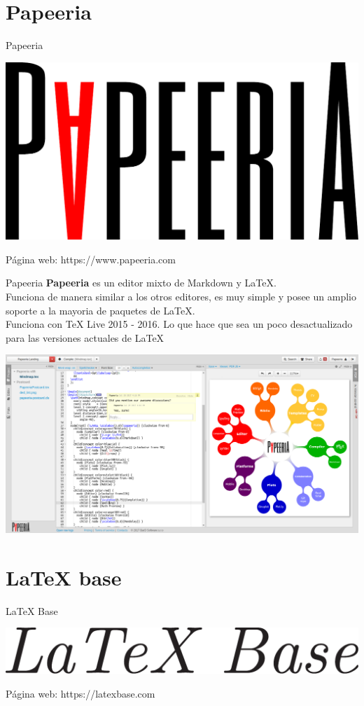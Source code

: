 \documentclass[12pt,aspectratio=43]{beamer}
\newcommand{\lmr}{\fontfamily{lmr}\selectfont}
\begin{document}
\section{Papeeria}
\begin{frame}{Papeeria}{}
\begin{center}
	\includegraphics[width=0.7\linewidth]{Papeeria_Logo}
\end{center}

Página web: https://www.papeeria.com
\end{frame}

\begin{frame}{Papeeria}{}
\alert{\bf Papeeria} es un editor mixto de Markdown y LaTeX.\pause\\[1em]

Funciona de manera similar a los otros editores, es muy simple y posee un amplio soporte a la mayoria de paquetes de {\lmr\LaTeX}.\pause\\[1em]

Funciona con {\lmr\TeX} Live 2015 - 2016. Lo que hace que sea un poco desactualizado para las versiones actuales de {\lmr\LaTeX}
\end{frame}

\begin{frame}[plain]{}{}
\includegraphics[width=\linewidth]{Papeeria_Screen}
\end{frame}

\section{LaTeX base}
\begin{frame}{LaTeX Base}{}
\begin{center}
	\includegraphics[width=0.7\linewidth]{LaTeXBase_Logo}
\end{center}

Página web: https://latexbase.com
\end{frame}
\end{document}
